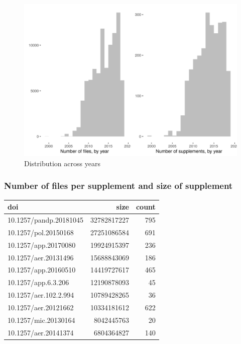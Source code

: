 \documentclass[]{article}
\begin{document}
\begin{figure}
\centering
\includegraphics{figure_years.png}
\caption{Distribution across years}
\end{figure}

\hypertarget{number-of-files-per-supplement-and-size-of-supplement}{%
\subsubsection{Number of files per supplement and size of
supplement}\label{number-of-files-per-supplement-and-size-of-supplement}}

\begin{table}[H]
\centering
\begin{tabular}{l|r|r}
\hline
doi & size & count\\
\hline
10.1257/pandp.20181045 & 32782817227 & 795\\
\hline
10.1257/pol.20150168 & 27251086584 & 691\\
\hline
10.1257/app.20170080 & 19924915397 & 236\\
\hline
10.1257/aer.20131496 & 15688843069 & 186\\
\hline
10.1257/app.20160510 & 14419727617 & 465\\
\hline
10.1257/app.6.3.206 & 12190878093 & 45\\
\hline
10.1257/aer.102.2.994 & 10789428265 & 36\\
\hline
10.1257/aer.20121662 & 10334181612 & 622\\
\hline
10.1257/mic.20130164 & 8042445763 & 20\\
\hline
10.1257/aer.20141374 & 6804364827 & 140\\
\hline
\end{tabular}
\end{table}
\end{document}
